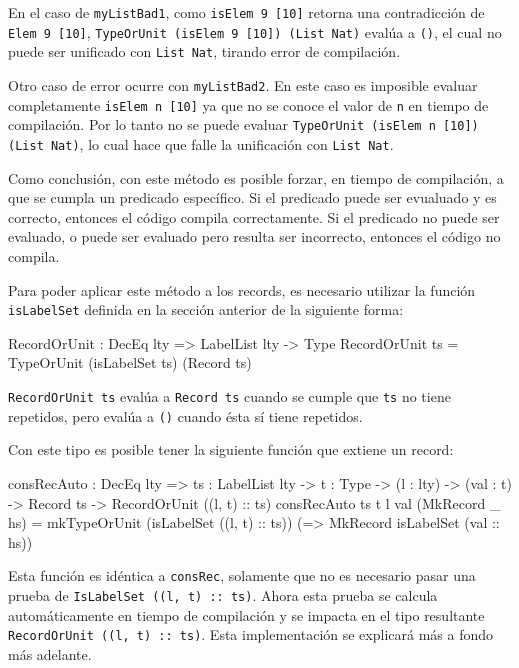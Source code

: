 En el caso de \texttt{myListBad1}, como \texttt{isElem 9 [10]} retorna una contradicción de \texttt{Elem 9 [10]}, \texttt{TypeOrUnit (isElem 9 [10]) (List Nat)} evalúa a \texttt{()}, el cual no puede ser unificado con \texttt{List Nat}, tirando error de compilación.

Otro caso de error ocurre con \texttt{myListBad2}. En este caso es imposible evaluar completamente \texttt{isElem n [10]} ya que no se conoce el valor de \texttt{n} en tiempo de compilación. Por lo tanto no se puede evaluar \texttt{TypeOrUnit (isElem n [10]) (List Nat)}, lo cual hace que falle la unificación con \texttt{List Nat}.

Como conclusión, con este método es posible forzar, en tiempo de compilación, a que se cumpla un predicado específico. Si el predicado puede ser evualuado y es correcto, entonces el código compila correctamente. Si el predicado no puede ser evaluado, o puede ser evaluado pero resulta ser incorrecto, entonces el código no compila.

Para poder aplicar este método a los records, es necesario utilizar la función \texttt{isLabelSet} definida en la sección anterior de la siguiente forma:

\begin{code}
RecordOrUnit : DecEq lty => LabelList lty -> Type
RecordOrUnit ts = TypeOrUnit (isLabelSet ts) (Record ts)
\end{code}

\texttt{RecordOrUnit ts} evalúa a \texttt{Record ts} cuando se cumple que \texttt{ts} no tiene repetidos, pero evalúa a \texttt{()} cuando ésta sí tiene repetidos.

Con este tipo es posible tener la siguiente función que extiene un record:

\begin{code}
consRecAuto : DecEq lty => {ts : LabelList lty} ->
  {t : Type} -> (l : lty) -> (val : t) -> Record ts ->
  RecordOrUnit ((l, t) :: ts)
consRecAuto {ts} {t} l val (MkRecord _ hs) =
  mkTypeOrUnit (isLabelSet ((l, t) :: ts))
  (\isLabelSet => MkRecord isLabelSet (val :: hs))
\end{code}

Esta función es idéntica a \texttt{consRec}, solamente que no es necesario pasar una prueba de \texttt{IsLabelSet ((l, t) :: ts)}. Ahora esta prueba se calcula automáticamente en tiempo de compilación y se impacta en el tipo resultante \texttt{RecordOrUnit ((l, t) :: ts)}. Esta implementación se explicará más a fondo más adelante.

